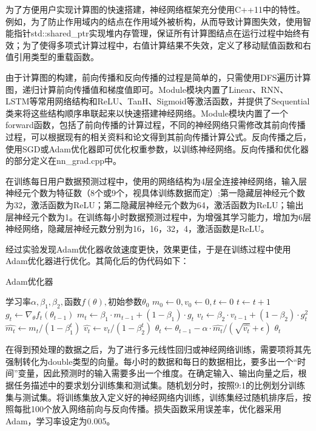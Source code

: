 \documentclass[CJK]{ctexart}
\begin{document}
\begin{enumerate}[(1)]
    \qquad 为了方便用户实现计算图的快速搭建，神经网络框架充分使用C++11中的特性。例如，为了防止作用域内的结点在作用域外被析构，从而导致计算图失效，使用智能指针std::shared\_ptr实现堆内存管理，保证所有计算图结点在运行过程中始终有效；为了使得多项式计算过程中，右值计算结果不失效，定义了移动赋值函数和右值引用类型的重载函数。\par
    \qquad 由于计算图的构建，前向传播和反向传播的过程是简单的，只需使用DFS遍历计算图，递归计算前向传播值和梯度值即可。Module模块内置了Linear、RNN、LSTM等常用网络结构和ReLU、TanH、Sigmoid等激活函数，并提供了Sequential类来将这些结构顺序串联起来以快速搭建神经网络。Module模块内置了一个forward函数，包括了前向传播的计算过程，不同的神经网络只需修改其前向传播过程，可以根据现有的相关资料和论文得到其前向传播计算公式。反向传播之后，使用SGD或Adam优化器即可优化权重参数，以训练神经网络。反向传播和优化器的部分定义在nn\_grad.cpp中。\par
    \qquad 在训练每日用户数据预测过程中，使用的网络结构为4层全连接神经网络，输入层神经元个数为特征数（8个或9个，视具体训练数据而定）;第一隐藏层神经元个数为32，激活函数为ReLU；第二隐藏层神经元个数为64，激活函数为ReLU；输出层神经元个数为1。在训练每小时数据预测过程中，为增强其学习能力，增加为6层神经网络，隐藏层神经元数分别为16，16，32，4，激活函数是ReLU。\par
    \qquad 经过实验发现Adam优化器收敛速度更快，效果更佳，于是在训练过程中使用Adam优化器进行优化。其简化后的伪代码如下：
    \begin{algorithm}
        \caption{Adam优化器}
        \begin{spacing}{1.1}
        \begin{algorithmic}[1]
            \Require $\textbf{学习率}\alpha,\beta_1,\beta_2,\textbf{函数}f(\theta),\textbf{初始参数}\theta_0$
            \State $m_0\leftarrow0,v_0\leftarrow0,t\leftarrow0$
            \State $t\leftarrow t+1$
            \State $g_t\leftarrow \nabla_\theta f_t(\theta_{t-1})$
            \State $m_t\leftarrow \beta_1\cdot m_{t-1}+(1-\beta_1)\cdot g_t$
            \State $v_t\leftarrow \beta_2\cdot v_{t-1}+(1-\beta_2)\cdot g_t^2$
            \State $\hat{m_t}\leftarrow m_t/(1-\beta_1^t)$
            \State $\hat{v_t}\leftarrow v_t/(1-\beta_2^t)$
            \State $\theta_t\leftarrow \theta_{t-1}-\alpha\cdot\hat{m_t}/(\sqrt{\hat{v_t}}+\epsilon)$
            \EndWhile
            \State \Return $\theta_t$
        \end{algorithmic}    
        \end{spacing}
    \end{algorithm}
\end{enumerate}\par
在得到预处理的数据之后，为了进行多元线性回归或神经网络训练，需要项将其先强制转化为double类型的向量。每小时的数据和每日的数据相比，要多出一个“时间”变量，因此预测时的输入需要多出一个维度。在确定输入、输出向量之后，根据任务描述中的要求划分训练集和测试集。随机划分时，按照9:1的比例划分训练集与测试集。将训练集放入定义好的神经网络内训练，训练集经过随机排序后，按照每批100个放入网络前向与反向传播。损失函数采用误差率，优化器采用Adam，学习率设定为0.005。
\end{document}
